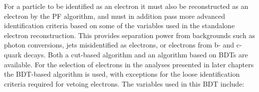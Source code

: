 
For a particle to be identified as an electron it 
must also be reconstructed as an electron by the \ac{PF} algorithm, 
and must in addition pass more advanced identification criteria based on some of the variables used in the
standalone electron reconstruction. This provides separation power from backgrounds
such as photon conversions, jets misidentified as electrons, or electrons from b- and c-quark
decays. Both a cut-based algorithm and an algorithm based on \acp{BDT} are available. %
For the selection of electrons in 
the analyses presented in later chapters the \ac{BDT}-based algorithm is used, 
with exceptions for the loose identification criteria required for vetoing electrons. 
The variables used in this \ac{BDT} include:%
